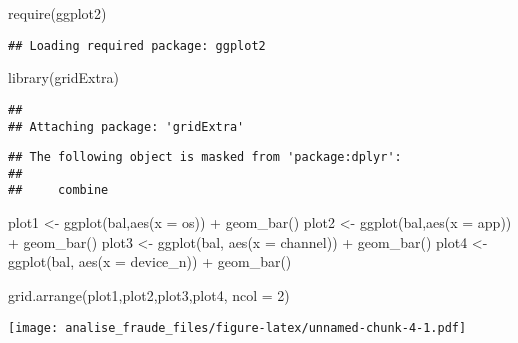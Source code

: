 \documentclass[
]{article}
\newenvironment{Shaded}{\begin{snugshade}}{\end{snugshade}}
\newcommand{\AttributeTok}[1]{\textcolor[rgb]{0.77,0.63,0.00}{#1}}
\newcommand{\DecValTok}[1]{\textcolor[rgb]{0.00,0.00,0.81}{#1}}
\newcommand{\FunctionTok}[1]{\textcolor[rgb]{0.00,0.00,0.00}{#1}}
\newcommand{\NormalTok}[1]{#1}
\newcommand{\OtherTok}[1]{\textcolor[rgb]{0.56,0.35,0.01}{#1}}
\newcommand{\SpecialCharTok}[1]{\textcolor[rgb]{0.00,0.00,0.00}{#1}}
\begin{document}
\begin{Shaded}
\begin{Highlighting}[]
\FunctionTok{require}\NormalTok{(ggplot2)}
\end{Highlighting}
\end{Shaded}

\begin{verbatim}
## Loading required package: ggplot2
\end{verbatim}

\begin{Shaded}
\begin{Highlighting}[]
\FunctionTok{library}\NormalTok{(gridExtra)}
\end{Highlighting}
\end{Shaded}

\begin{verbatim}
## 
## Attaching package: 'gridExtra'
\end{verbatim}

\begin{verbatim}
## The following object is masked from 'package:dplyr':
## 
##     combine
\end{verbatim}

\begin{Shaded}
\begin{Highlighting}[]
\NormalTok{plot1 }\OtherTok{\textless{}{-}} \FunctionTok{ggplot}\NormalTok{(bal,}\FunctionTok{aes}\NormalTok{(}\AttributeTok{x =}\NormalTok{ os)) }\SpecialCharTok{+} \FunctionTok{geom\_bar}\NormalTok{()}
\NormalTok{plot2 }\OtherTok{\textless{}{-}} \FunctionTok{ggplot}\NormalTok{(bal,}\FunctionTok{aes}\NormalTok{(}\AttributeTok{x =}\NormalTok{ app)) }\SpecialCharTok{+} \FunctionTok{geom\_bar}\NormalTok{()}
\NormalTok{plot3 }\OtherTok{\textless{}{-}} \FunctionTok{ggplot}\NormalTok{(bal, }\FunctionTok{aes}\NormalTok{(}\AttributeTok{x =}\NormalTok{ channel)) }\SpecialCharTok{+} \FunctionTok{geom\_bar}\NormalTok{()}
\NormalTok{plot4 }\OtherTok{\textless{}{-}} \FunctionTok{ggplot}\NormalTok{(bal, }\FunctionTok{aes}\NormalTok{(}\AttributeTok{x =}\NormalTok{ device\_n)) }\SpecialCharTok{+} \FunctionTok{geom\_bar}\NormalTok{()}

\FunctionTok{grid.arrange}\NormalTok{(plot1,plot2,plot3,plot4, }\AttributeTok{ncol =} \DecValTok{2}\NormalTok{)}
\end{Highlighting}
\end{Shaded}

\texttt{[image: analise\_fraude\_files/figure-latex/unnamed-chunk-4-1.pdf]}
\end{document}
